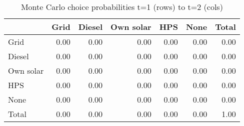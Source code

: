 \begin{table}[!ht]
	\centering
		\caption{Monte Carlo choice probabilities t=1 (rows) to t=2 (cols)}
\begin{tabular}{lrrrrrr}
		\toprule
               &      Grid&    Diesel& Own solar&       HPS&      None&     Total\\
		\midrule
		           Grid&      0.00&      0.00&      0.00&      0.00&      0.00&      0.00\\
		         Diesel&      0.00&      0.00&      0.00&      0.00&      0.00&      0.00\\
		      Own solar&      0.00&      0.00&      0.00&      0.00&      0.00&      0.00\\
		            HPS&      0.00&      0.00&      0.00&      0.00&      0.00&      0.00\\
		           None&      0.00&      0.00&      0.00&      0.00&      0.00&      0.00\\
		          Total&      0.00&      0.00&      0.00&      0.00&      0.00&      1.00\\
		\bottomrule
	\end{tabular}
\end{table}
